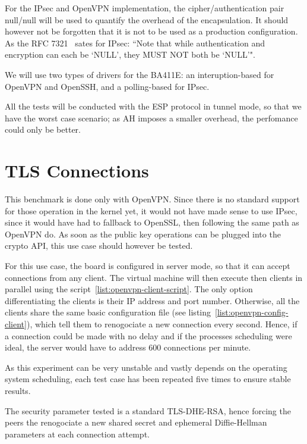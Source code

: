 For the IPsec and OpenVPN implementation, the cipher/authentication pair null/null will be used to quantify the overhead of the encapsulation.
It should however not be forgotten that it is not to be used as a production configuration.
As the RFC 7321~\citep[pg. 7]{rfc7321} sates for IPsec: ``Note that while authentication and encryption can each
   be `NULL', they MUST NOT both be `NULL'".

We will use two types of drivers for the BA411E: an interuption-based for OpenVPN and OpenSSH, and a polling-based for IPsec.

All the tests will be conducted with the ESP protocol in tunnel mode, so that we have the worst case scenario; as AH imposes a smaller overhead, the perfomance could only be better.

\section{TLS Connections}
This benchmark is done only with OpenVPN.
Since there is no standard support for those operation in the kernel yet, it would not have made sense to use IPsec, since it would have had to fallback to OpenSSL, then following the same path as OpenVPN do.
As soon as the public key operations can be plugged into the crypto API, this use case should however be tested.

For this use case, the board is configured in server mode, so that it can accept connections from any client.
The virtual machine will then execute then clients in parallel using the script~\ref{list:openvpn-client-script}.
The only option differentiating the clients is their IP address and port number.
Otherwise, all the clients share the same basic configuration file (see listing~\ref{list:openvpn-config-client}), which tell them to renogociate a new connection every second.
Hence, if a connection could be made with no delay and if the processes scheduling were ideal, the server would have to address 600 connections per minute.



As this experiment can be very unstable and vastly depends on the operating system scheduling, each test case has been repeated five times to ensure stable results.

The security parameter tested is a standard TLS-DHE-RSA, hence forcing the peers the renogociate a new shared secret and ephemeral Diffie-Hellman parameters at each connection attempt.


